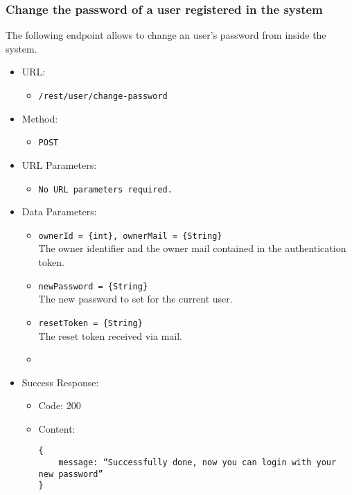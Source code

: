 \subsubsection*{Change the password of a user registered in the system}

The following endpoint allows to change an user's password from inside the system.

\begin{itemize}
    
    \item URL: 
    \begin{itemize}
        \item \texttt{/rest/user/change-password}
    \end{itemize}
    
    \item Method: 
    \begin{itemize}
        \item \texttt{POST}
    \end{itemize}
    
    \item URL Parameters: 
    \begin{itemize}
        \item \texttt{No URL parameters required.} 
    \end{itemize}
    
    \item Data Parameters: 
    \begin{itemize}
        \item \texttt{ownerId = \{int\}, ownerMail = \{String\}} \\
        The owner identifier and the owner mail contained in the authentication token.    
        \item \texttt{newPassword = \{String\}} \\
        The new password to set for the current user.
        \item \texttt{resetToken = \{String\}} \\
        The reset token received via mail.
        \item 
    \end{itemize}
    
    \item Success Response: 
    \begin{itemize}
        \item Code: 200
        \item Content:
        \begin{lstlisting}
{
    message: “Successfully done, now you can login with your new password”
}
        \end{lstlisting}
    \end{itemize}
    

\end{itemize}
